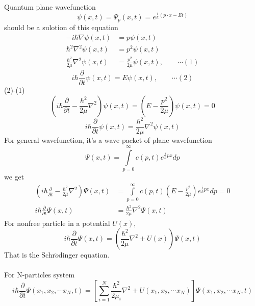 \begin{frame} [allowframebreaks=]
    \frametitle{}
    \alert{\faHeartbeat} Quantum plane wavefunction \[\psi(x,t)=\Psi_p(x,t)=e^{\frac{i}{\hbar}(p\cdot x-Et)} \]
    should be a sulotion of this equation
    \begin{equation*}
        \begin{split}
       -i\hbar \nabla \psi(x,t) &=p\psi(x,t) \\
       \hbar^2 \nabla^2 \psi(x,t) &=p^2\psi(x,t) \\
       \frac{\hbar^2}{2\mu} \nabla^2 \psi(x,t) &=\frac{p^2}{2\mu} \psi(x,t) , \qquad \cdots (1)
        \end{split}
    \end{equation*}
    \begin{equation*}
       i\hbar \frac{\partial }{\partial t} \psi(x,t) =E\psi(x,t)  , \qquad \cdots (2)
     \end{equation*}
    (2)-(1)
    \begin{equation*}
        (i\hbar \frac{\partial }{\partial t} - \frac{\hbar^2}{2\mu} \nabla^2 )\psi(x,t) =(E-\frac{p^2}{2\mu})\psi(x,t)=0  
    \end{equation*}
    \begin{equation*}
        i\hbar \frac{\partial }{\partial t} \psi(x,t) = \frac{\hbar^2}{2\mu} \nabla^2 \psi(x,t)
    \end{equation*}
    For general wavefunction, it's a wave packet of plane wavefunction
    \begin{equation*}
        \Psi(x,t)= \int\limits_{p=0} ^{\infty} c(p,t) e^{\frac{i}{\hbar}px}dp
    \end{equation*}
    we get 
    \begin{equation*}
        \begin{split}
        (i\hbar \frac{\partial }{\partial t} - \frac{\hbar^2}{2\mu} \nabla^2 )\Psi(x,t) &= \int\limits_{p=0} ^{\infty} c(p,t) (E-\frac{p^2}{2\mu}) e^{\frac{i}{\hbar}px}dp=0  \\
        i\hbar \frac{\partial }{\partial t} \Psi(x,t) &= \frac{\hbar^2}{2\mu} \nabla^2 \Psi(x,t)
        \end{split}
    \end{equation*}
    For nonfree particle in a potential $U(x)$,
    \begin{equation*}
        \boxed{i\hbar \frac{\partial }{\partial t} \Psi(x,t) = (\frac{\hbar^2}{2\mu} \nabla^2 +U(x)) \Psi(x,t)}
    \end{equation*}
    That is the Schr$\ddot{o}$dinger equation. \\
    ~~\\
    \bullet For N-particles system
   {\small \begin{equation*}
        i\hbar \frac{\partial }{\partial t} \Psi(x_1, x_2, \cdots x_N,t) = [\sum_{i=1} ^{N} \frac{\hbar ^2}{2\mu_i} \nabla^2 +U(x_1, x_2, \cdots x_N)] \Psi(x_1, x_2, \cdots x_N,t)
    \end{equation*}}
\end{frame}

